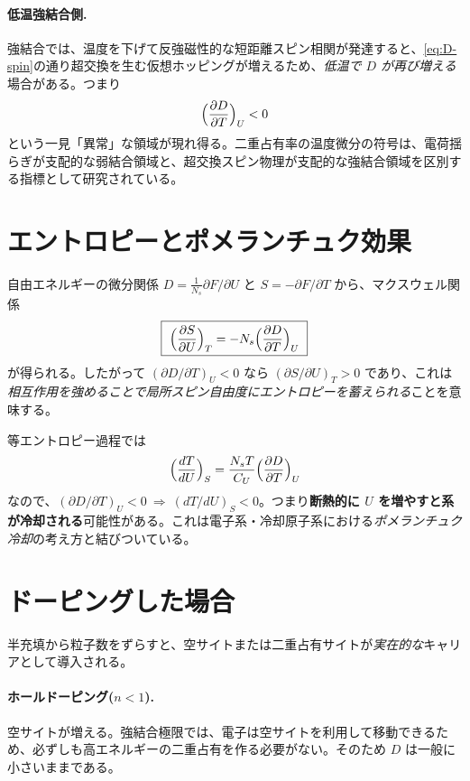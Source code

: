 \documentclass[11pt,a4paper]{ltjsarticle}
\begin{document}
\paragraph{低温強結合側.}強結合では、温度を下げて反強磁性的な短距離スピン相関が発達すると、\eqref{eq:D-spin}の通り超交換を生む仮想ホッピングが増えるため、\emph{低温で $D$ が再び増える}場合がある。つまり
\begin{equation}
  \Bigl(\frac{\partial D}{\partial T}\Bigr)_U < 0
\end{equation}
という一見「異常」な領域が現れ得る。二重占有率の温度微分の符号は、電荷揺らぎが支配的な弱結合領域と、超交換スピン物理が支配的な強結合領域を区別する指標として研究されている。

\section{エントロピーとポメランチュク効果}

自由エネルギーの微分関係 $D=\frac{1}{N_s}\partial F/\partial U$ と $S=-\partial F/\partial T$ から、マクスウェル関係
\begin{equation}
  \boxed{\ \Bigl(\frac{\partial S}{\partial U}\Bigr)_T = -N_s\Bigl(\frac{\partial D}{\partial T}\Bigr)_U\ }
\end{equation}
が得られる。したがって $(\partial D/\partial T)_U<0$ なら $(\partial S/\partial U)_T>0$ であり、これは\emph{相互作用を強めることで局所スピン自由度にエントロピーを蓄えられる}ことを意味する。

等エントロピー過程では
\begin{equation}
  \Bigl(\frac{dT}{dU}\Bigr)_S = \frac{N_sT}{C_U}\Bigl(\frac{\partial D}{\partial T}\Bigr)_U
\end{equation}
なので、$(\partial D/\partial T)_U<0\ \Rightarrow\ (dT/dU)_S<0$。つまり\textbf{断熱的に $U$ を増やすと系が冷却される}可能性がある。これは電子系・冷却原子系における\emph{ポメランチュク冷却}の考え方と結びついている。

\section{ドーピングした場合}
\label{sec:doping}

半充填から粒子数をずらすと、空サイトまたは二重占有サイトが\emph{実在的な}キャリアとして導入される。

\paragraph{ホールドーピング($n<1$).}空サイトが増える。強結合極限では、電子は空サイトを利用して移動できるため、必ずしも高エネルギーの二重占有を作る必要がない。そのため $D$ は一般に小さいままである。
\end{document}
